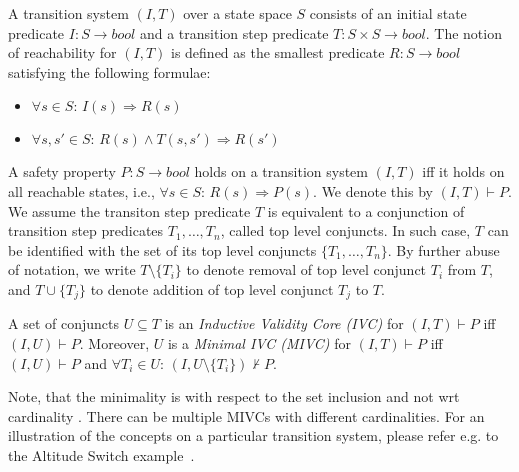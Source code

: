 A transition system $(I,T)$ over a state space $S$ consists of an initial state predicate $I : S \rightarrow bool$ and a transition step predicate $T : S \times S \rightarrow bool$. The notion of reachability for $(I, T)$ is defined as the smallest predicate $R : S \rightarrow bool$ satisfying the following formulae:

\vspace{-5pt}
\begin{itemize}
	\item[] $\forall s \in S: \, I(s) \Rightarrow R(s)$
	\item[] $\forall s, s' \in S: \, R(s) \wedge T(s, s') \Rightarrow R(s')$
\end{itemize}

\vspace{-5pt}
A safety property $P: S \rightarrow bool$ holds on a transition system $(I, T)$ iff it holds on all reachable states, i.e., $\forall s \in S: \, R(s) \Rightarrow P(s)$. We denote this by $(I, T) \vdash P$. We assume
the transiton step predicate $T$ is equivalent to   a conjunction of transition step predicates $T_1, \ldots, T_n$,  called top level conjuncts.
In such case, $T$ can be identified with the set of its top level conjuncts $\{ T_1, \ldots, T_n\}$. By further abuse of notation, we write $T \setminus \{ T_i \}$ to denote removal of top level conjunct $T_i$ from $T$, and $T \cup \{ T_j\}$ to denote addition of top level conjunct $T_j$ to $T$.


\begin{definition}
A set of conjuncts $U \subseteq T$ is an \emph{ Inductive Validity Core (IVC)} for $(I, T) \vdash P$ iff $(I, U) \vdash P$. Moreover, $U$ is a \emph{Minimal IVC (MIVC)} for $(I, T) \vdash P$ iff $(I, U) \vdash P$ and $\forall T_i \in U: \, (I, U \setminus \{ T_i\}) \nvdash P$.
\end{definition}

Note, that the minimality  is with respect to the set inclusion and not wrt cardinality . There can be multiple MIVCs with different cardinalities.
For an illustration of the concepts on a particular transition system, please refer e.g. to the Altitude Switch example~\cite{Ghass17AllIVCs}.




